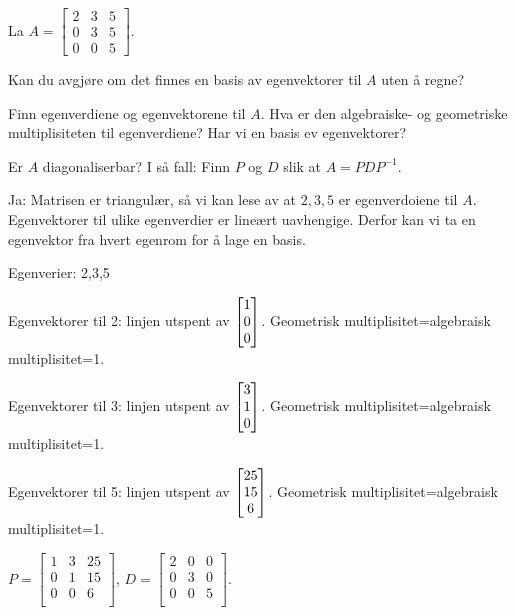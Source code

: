 \begin{oppgave}
La $A=\begin{bmatrix}
2 & 3 & 5\\
0 & 3 & 5\\
0 & 0 & 5
\end{bmatrix}$. 

\begin{punkt}
Kan du avgjøre om det finnes en basis av egenvektorer til $A$ uten å regne?
\end{punkt}

\begin{punkt}
Finn egenverdiene og egenvektorene til $A$. Hva er den algebraiske- og geometriske multiplisiteten til egenverdiene? Har vi en basis ev egenvektorer?
\end{punkt}

\begin{punkt}
Er $A$ diagonaliserbar? I så fall: Finn $P$ og $D$ slik at $A=PDP^{-1}$.
\end{punkt}

\end{oppgave}


\begin{losning}
\begin{punkt}
Ja: Matrisen er triangulær, så vi kan lese av at $2,3,5$ er egenverdoiene til $A$. Egenvektorer til ulike egenverdier er lineært uavhengige. Derfor kan vi ta en egenvektor fra hvert egenrom for å lage en basis.
\end{punkt}

\begin{punkt}
Egenverier: 2,3,5

\noindent
Egenvektorer til  2: linjen utspent av $\begin{bmatrix} 1 \\ 0 \\ 0 \end{bmatrix}$. Geometrisk multiplisitet=algebraisk multiplisitet=1.

\noindent
Egenvektorer til  3: linjen utspent av $\begin{bmatrix} 3 \\ 1 \\ 0 \end{bmatrix}$. Geometrisk multiplisitet=algebraisk multiplisitet=1.

\noindent
Egenvektorer til  5: linjen utspent av $\begin{bmatrix} 25 \\ 15 \\ 6 \end{bmatrix}$. Geometrisk multiplisitet=algebraisk multiplisitet=1.


\end{punkt}

$P=\begin{bmatrix}
1 & 3 & 25\\
0 & 1 & 15\\
0 & 0 & 6\\
\end{bmatrix}$, $D=\begin{bmatrix}
2 & 0 & 0\\
0 & 3 & 0\\
0 & 0 & 5\\
\end{bmatrix}.$

\end{losning}


